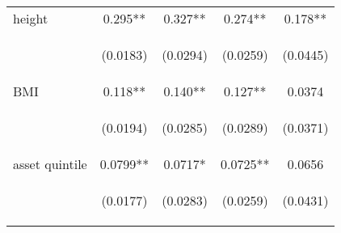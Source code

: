 \documentclass{article}[11pt,subeqn]
\begin{document}
\begin{spacing}{1.5}
\begin{table}[htpb!]
\begin{center}
\begin{tabular}{lcccc}
height & 0.295** & 0.327** & 0.274** & 0.178** \\
\vspace{4pt} & \begin{footnotesize}(0.0183)\end{footnotesize} & \begin{footnotesize}(0.0294)\end{footnotesize} & \begin{footnotesize}(0.0259)\end{footnotesize} & \begin{footnotesize}(0.0445)\end{footnotesize} \\
BMI & 0.118** & 0.140** & 0.127** & 0.0374 \\
\vspace{4pt} & \begin{footnotesize}(0.0194)\end{footnotesize} & \begin{footnotesize}(0.0285)\end{footnotesize} & \begin{footnotesize}(0.0289)\end{footnotesize} & \begin{footnotesize}(0.0371)\end{footnotesize} \\
asset quintile & 0.0799** & 0.0717* & 0.0725** & 0.0656 \\
\vspace{4pt} & \begin{footnotesize}(0.0177)\end{footnotesize} & \begin{footnotesize}(0.0283)\end{footnotesize} & \begin{footnotesize}(0.0259)\end{footnotesize} & \begin{footnotesize}(0.0431)\end{footnotesize} \\

\end{tabular}
\end{center}
\end{table}
\end{spacing}
\end{document}
